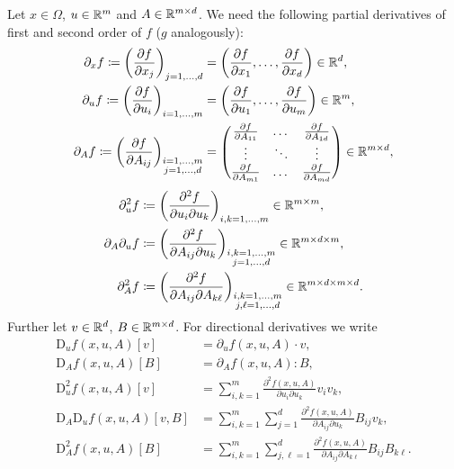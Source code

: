 \documentclass[12pt,a4paper]{article}
\begin{document}
Let $x\in\Omega$, $u\in{\mathbb R}^m$ and $A\in{\mathbb R}^{m\times d}$.
We need the following partial derivatives of first and second order of $f$ ($g$ analogously):
\[
\begin{aligned}
    \partial_x f 
    \coloneqq \left(\frac{\partial f}{\partial x_j}\right)_{j=1,\dots,d} 
    &=\left(\frac{\partial f}{\partial x_1},\dots, \frac{\partial f}{\partial x_d}\right) 
    \in{\mathbb R}^d,
    \\
    \partial_u f 
    \coloneqq \left(\frac{\partial f}{\partial u_i}\right)_{i=1,\dots,m}
    &=\left(\frac{\partial f}{\partial u_1},\dots, \frac{\partial f}{\partial u_m}\right) 
    \in{\mathbb R}^m,
    \\
    \partial_A f 
    \coloneqq \left(\frac{\partial f}{\partial A_{ij}}\right)_{\substack{i=1,\dots,m\\j=1,\dots,d}}
    &=\begin{pmatrix}
        \frac{\partial f}{\partial A_{11}} & \dots &  \frac{\partial f}{\partial A_{1d}} \\
        \vdots & \ddots & \vdots\\
        \frac{\partial f}{\partial A_{m1}}
        & \dots &  \frac{\partial f}{\partial A_{md}}
    \end{pmatrix}
    \in{\mathbb R}^{m\times d},
\end{aligned}
\]
\[
\begin{aligned}
    \partial_u^2 f 
    &\coloneqq \left(\frac{\partial^2 f}{\partial u_i\partial u_k}\right)_{\substack{i,k=1,\dots,m}}
    \in{\mathbb R}^{m\times m},
    \\
    \partial_A\partial_u f 
    &\coloneqq 
    \left(\frac{\partial^2 f}{\partial A_{ij}\partial u_k}\right)_{\substack{i,k=1,\dots,m\\j=1,\dots,d}}
    \in{\mathbb R}^{m\times d\times m},
    \\
    \partial_A^2 f 
    &\coloneqq 
    \left(\frac{\partial^2 f}{\partial A_{ij}\partial A_{k\ell}}\right)_{\substack{i,k=1,\dots,m\\j,\ell=1,\dots,d}}
    \in{\mathbb R}^{m\times d\times m\times d}.
\end{aligned}
\]
Further let $v\in{\mathbb R}^d$, $B\in{\mathbb R}^{m\times d}$.
For directional derivatives we write
\[
\begin{aligned}
    \mathrm{D}_u f(x,u,A)[v]
    &=\partial_u f(x,u,A)\cdot v,
    \\
    \mathrm{D}_A f(x,u,A)[B]
    &=\partial_A f(x,u,A):B,
    \\
    \mathrm{D}_u^2 f(x,u,A)[v]
    &=\sum_{i,k=1}^m
    \frac{\partial^2 f(x,u,A)}{\partial u_i\partial u_k} v_i v_k,
    \\
    \mathrm{D}_A\mathrm{D}_u f(x,u,A)[v,B]
    &=\sum_{i,k=1}^m\sum_{j=1}^d\frac{\partial^2 f(x,u,A)}{\partial A_{ij}\partial u_k} B_{ij}v_k,
    \\
    \mathrm{D}_A^2 f(x,u,A)[B]
    &=\sum_{i,k=1}^m\sum_{j,\ell=1}^d\frac{\partial^2 f(x,u,A)}{\partial A_{ij}\partial A_{k\ell}}B_{ij}B_{k\ell}.
\end{aligned}
\]
\end{document}
